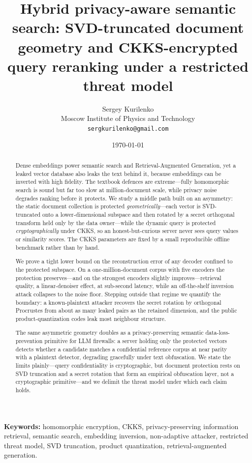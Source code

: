 \documentclass[11pt,a4paper]{article}
\title{\textbf{Hybrid privacy-aware semantic search: SVD-truncated
document geometry and CKKS-encrypted query reranking under a restricted
threat model}}
\author{Sergey Kurilenko\\
\small Moscow Institute of Physics and Technology\\
\small \texttt{sergkurilenko@gmail.com}}
\date{\today}
\begin{document}
\maketitle

\begin{abstract}
\noindent
Dense embeddings power semantic search and Retrieval-Augmented
Generation, yet a leaked vector database also leaks the text behind it,
because embeddings can be inverted with high fidelity. The textbook
defences are extreme---fully homomorphic search is sound but far too slow
at million-document scale, while privacy noise degrades ranking before it
protects. We study a middle path built on an asymmetry: the static
document collection is protected \emph{geometrically}---each vector is
SVD-truncated onto a lower-dimensional subspace and then rotated by a
secret orthogonal transform held only by the data owner---while the
dynamic query is protected \emph{cryptographically} under CKKS, so an
honest-but-curious server never sees query values or similarity scores.
The CKKS parameters are fixed by a small reproducible offline benchmark
rather than by hand.

We prove a tight lower bound on the reconstruction error of any decoder
confined to the protected subspace. On a one-million-document corpus with
five encoders the protection preserves---and on the strongest encoders
slightly improves---retrieval quality, a linear-denoiser effect, at
sub-second latency, while an off-the-shelf inversion attack collapses to
the noise floor. Stepping outside that regime we quantify the boundary: a
known-plaintext attacker recovers the secret rotation by orthogonal
Procrustes from about as many leaked pairs as the retained dimension, and
the public product-quantization codes leak most neighbour structure.

The same asymmetric geometry doubles as a privacy-preserving semantic
data-loss-prevention primitive for LLM firewalls: a server holding only
the protected vectors detects whether a candidate matches a confidential
reference corpus at near parity with a plaintext detector, degrading
gracefully under text obfuscation. We state the limits plainly---query
confidentiality is cryptographic, but document protection rests on SVD
truncation and a secret rotation that form an empirical obfuscation
layer, not a cryptographic primitive---and we delimit the threat model
under which each claim holds.
\end{abstract}

\textbf{Keywords:}
homomorphic encryption, CKKS, privacy-preserving information retrieval,
semantic search, embedding inversion, non-adaptive attacker, restricted
threat model, SVD truncation, product quantization,
retrieval-augmented generation.
\end{document}
